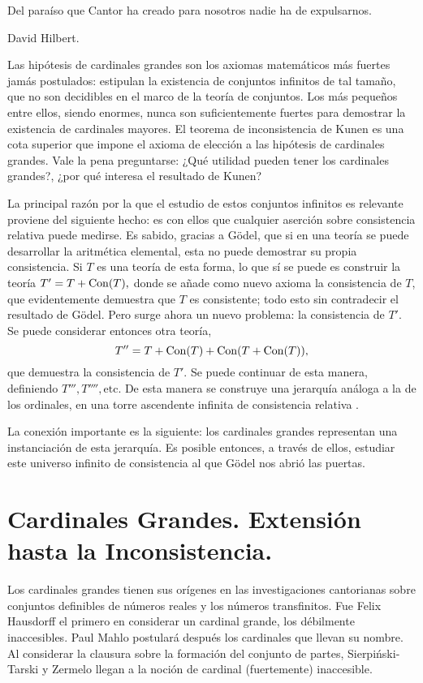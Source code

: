 \documentclass
[
  12pt,
  letterpaper,
  openany,
  oneside,
]{book}
\begin{document}
\epigraph
{
Del paraíso que Cantor ha creado para nosotros nadie ha de expulsarnos.
}
{David Hilbert. \autocite[170]{hilbert_uber_1926}}

Las hipótesis de cardinales grandes son los axiomas matemáticos
más fuertes jamás postulados: estipulan la existencia de conjuntos
infinitos de tal tamaño, que no son decidibles en el marco de la teoría de conjuntos.
Los más pequeños entre ellos, siendo enormes, nunca son suficientemente
fuertes para demostrar la existencia de cardinales mayores.
El teorema de inconsistencia de Kunen es
una cota superior que impone el axioma de elección a las
hipótesis de cardinales grandes.
Vale la pena preguntarse: ¿Qué utilidad pueden tener los cardinales grandes?,
¿por qué interesa el resultado de Kunen?

La principal razón por la que el estudio de estos conjuntos infinitos
es relevante proviene del siguiente hecho:
es con ellos que cualquier aserción sobre consistencia relativa
puede medirse.
Es sabido, gracias a Gödel, que si en una teoría se puede desarrollar la aritmética
elemental, esta no puede demostrar su propia consistencia.
Si $T$ es una teoría de esta forma, lo que sí se puede es construir la teoría
$T'=T+\operatorname{Con} ( T ),$
donde se añade como nuevo axioma la consistencia
de $T$,
que evidentemente demuestra que $T$ es consistente; todo esto sin contradecir
el resultado de Gödel. Pero surge ahora un nuevo problema: la consistencia
de $T'$.
Se puede considerar entonces otra teoría,
\[T'' = T + \operatorname{Con} ( T ) + \operatorname{Con} ( T + \operatorname{Con} ( T ) ),\]
que demuestra la consistencia de $T'$.
Se puede continuar de esta manera, definiendo $T''', T'''',\text{etc}$.
De esta manera se construye una jerarquía análoga a la de los ordinales,
en una torre ascendente infinita de consistencia relativa
\autocite[\S 7.7, \S 8.9]{hamkins_lectures_2020}.

La conexión importante es la siguiente:
los cardinales grandes representan una instanciación de esta jerarquía.
Es posible entonces, a través de ellos, estudiar este universo infinito de
consistencia al que Gödel nos abrió las puertas.

\section*{Cardinales Grandes. Extensión hasta la Inconsistencia.}

Los cardinales grandes tienen sus orígenes en las investigaciones cantorianas
sobre conjuntos definibles de números reales y los números transfinitos.
Fue Felix Hausdorff \autocite{hausdorff_grundzuge_nodate}
el primero en considerar un cardinal grande,
los débilmente inaccesibles.
Paul Mahlo \autocite{mahlo_uber_1911,mahlo_zur_1912,mahlo_zur_1913}
postulará después los cardinales que llevan su nombre.
Al considerar la clausura sobre la formación del conjunto de partes,
Sierpiński-Tarski \autocite{sierpinski_sur_1930} y  Zermelo \autocite{zermelo_uber_1930}
llegan a la noción de cardinal (fuertemente) inaccesible.
\end{document}
